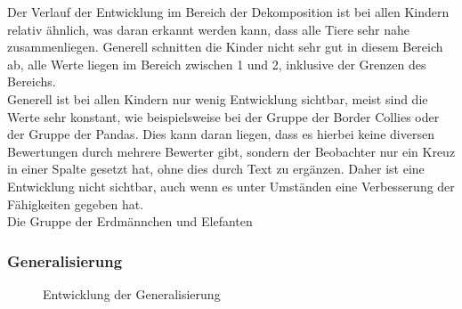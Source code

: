 Der Verlauf der Entwicklung im Bereich der Dekomposition ist bei allen Kindern relativ ähnlich, was daran erkannt werden kann, dass alle Tiere sehr nahe zusammenliegen. Generell schnitten die Kinder nicht sehr gut in diesem Bereich ab, alle Werte liegen im Bereich zwischen 1 und 2, inklusive der Grenzen des Bereichs.\\
Generell ist bei allen Kindern nur wenig Entwicklung sichtbar, meist sind die Werte sehr konstant, wie beispielsweise bei der Gruppe der Border Collies oder der Gruppe der Pandas. Dies kann daran liegen, dass es hierbei keine diversen Bewertungen durch mehrere Bewerter gibt, sondern der Beobachter nur ein Kreuz in einer Spalte gesetzt hat, ohne dies durch Text zu ergänzen. Daher ist eine Entwicklung nicht sichtbar, auch wenn es unter Umständen eine Verbesserung der Fähigkeiten gegeben hat.\\
Die Gruppe der Erdmännchen und Elefanten 

\subsubsection{Generalisierung}
\begin{figure}[H]
	\centering
	\caption{Entwicklung der Generalisierung}
\end{figure}
